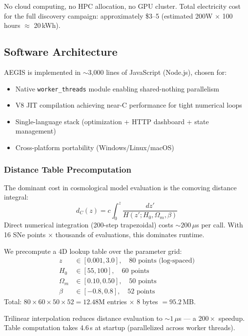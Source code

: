 \documentclass[twocolumn,showpacs,preprintnumbers,amsmath,amssymb,prl]{revtex4-2}
\begin{document}
No cloud computing, no HPC allocation, no GPU cluster. Total electricity cost for the full discovery campaign: approximately \$3--5 (estimated 200W $\times$ 100 hours $\approx$ 20\,kWh).

\subsection{Software Architecture}

AEGIS is implemented in $\sim$3,000 lines of JavaScript (Node.js), chosen for:
\begin{itemize}
\item Native \texttt{worker\_threads} module enabling shared-nothing parallelism
\item V8 JIT compilation achieving near-C performance for tight numerical loops
\item Single-language stack (optimization + HTTP dashboard + state management)
\item Cross-platform portability (Windows/Linux/macOS)
\end{itemize}

\subsubsection{Distance Table Precomputation}

The dominant cost in cosmological model evaluation is the comoving distance integral:
\begin{equation}
d_C(z) = c \int_0^z \frac{dz'}{H(z'; H_0, \Omega_m, \beta)}
\end{equation}
Direct numerical integration (200-step trapezoidal) costs $\sim 200\,\mu$s per call. With 16 SNe points $\times$ thousands of evaluations, this dominates runtime.

We precompute a 4D lookup table over the parameter grid:
\begin{align}
z &\in [0.001, 3.0], \quad 80\text{ points (log-spaced)} \\
H_0 &\in [55, 100], \quad 60\text{ points} \\
\Omega_m &\in [0.10, 0.50], \quad 50\text{ points} \\
\beta &\in [-0.8, 0.8], \quad 52\text{ points}
\end{align}
Total: $80 \times 60 \times 50 \times 52 = 12.48\text{M}$ entries $\times$ 8 bytes $= 95.2$\,MB.

Trilinear interpolation reduces distance evaluation to $\sim 1\,\mu$s --- a $200\times$ speedup. Table computation takes 4.6\,s at startup (parallelized across worker threads).
\end{document}
